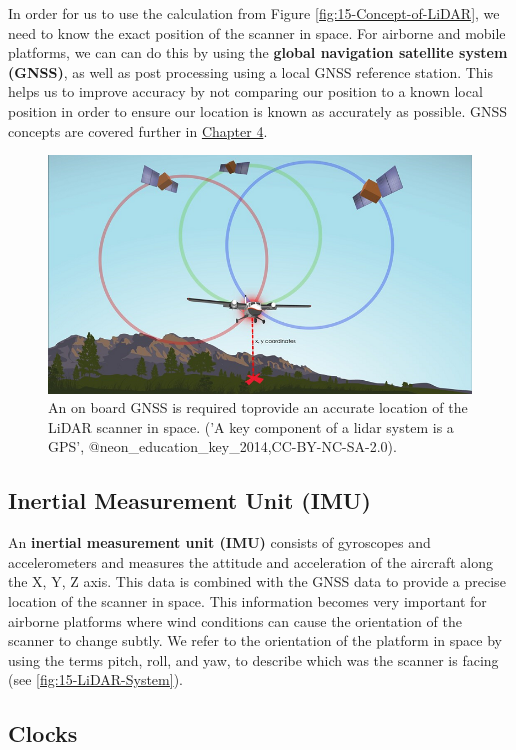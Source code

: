 \documentclass[
]{book}
\begin{document}
In order for us to use the calculation from Figure \ref{fig:15-Concept-of-LiDAR}, we need to know the exact position of the scanner in space. For airborne and mobile platforms, we can can do this by using the \textbf{global navigation satellite system (GNSS)}, as well as post processing using a local GNSS reference station. This helps us to improve accuracy by not comparing our position to a known local position in order to ensure our location is known as accurately as possible. GNSS concepts are covered further in \href{https://www.opengeomatics.ca/collecting-and-editing-data.html}{Chapter 4}.

\begin{figure}
\includegraphics[width=0.7\linewidth]{images/15-XYZ-coordinates} \caption{An on board GNSS is required toprovide an accurate location of the LiDAR scanner in space. ('A key component of a lidar system is a GPS', @neon_education_key_2014,CC-BY-NC-SA-2.0).}\label{fig:15-XYZ-coordinates}
\end{figure}

\hypertarget{inertial-measurement-unit-imu}{%
\subsection{Inertial Measurement Unit (IMU)}\label{inertial-measurement-unit-imu}}

An \textbf{inertial measurement unit (IMU)} consists of gyroscopes and accelerometers and measures the attitude and acceleration of the aircraft along the X, Y, Z axis. This data is combined with the GNSS data to provide a precise location of the scanner in space. This information becomes very important for airborne platforms where wind conditions can cause the orientation of the scanner to change subtly. We refer to the orientation of the platform in space by using the terms pitch, roll, and yaw, to describe which was the scanner is facing (see \ref{fig:15-LiDAR-System}).

\hypertarget{clocks}{%
\subsection{Clocks}\label{clocks}}
\end{document}
